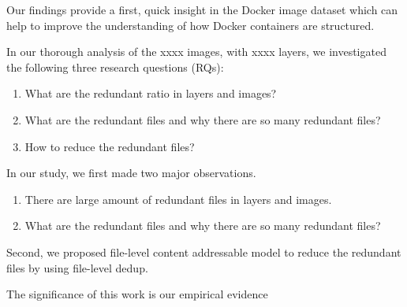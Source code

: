 Our findings provide a first, quick insight in the Docker image dataset which
can help to improve the understanding of how Docker containers are structured.

In our thorough analysis of the xxxx images, with xxxx layers, we investigated the following three research questions (RQs):

\begin{enumerate}
	\item What are the redundant ratio in layers and images?
	\item What are the redundant files and why there are so many redundant files?
	\item How to reduce the redundant files?
\end{enumerate}

In our study, we first made two major observations.
\begin{enumerate}
	\item There are large amount of redundant files in layers and images.
	\item What are the redundant files and why there are so many redundant files?
\end{enumerate}

Second, we proposed file-level content addressable model to reduce the redundant files by using file-level dedup.


The significance of this work is our empirical evidence 





